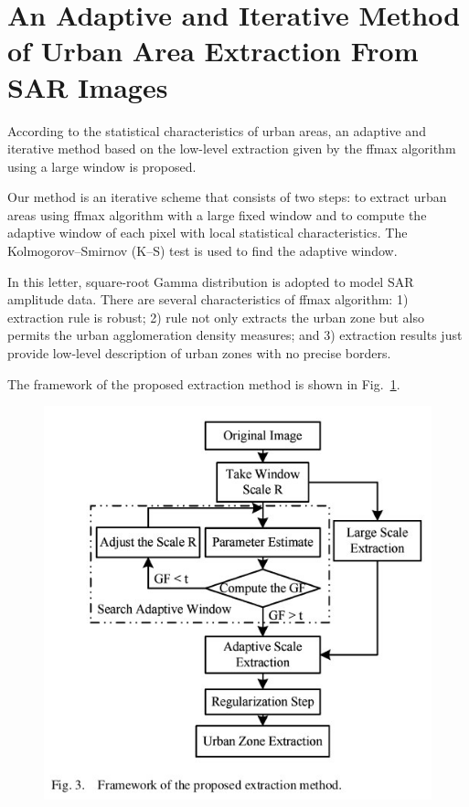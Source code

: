 \documentclass[paper=a4, fontsize=11pt]{scrartcl}
\begin{document}
\newpage

\section*{An Adaptive and Iterative Method of Urban Area Extraction From SAR Images}

According to the statistical characteristics of urban areas, an adaptive and iterative method based on the low-level extraction given by the ffmax algorithm using a large window is proposed. 

Our method is an iterative scheme that consists of two steps: to extract urban areas using ffmax algorithm with a large fixed window and to compute the adaptive window of each pixel with local statistical characteristics. 
The Kolmogorov–Smirnov (K–S) test is used to find the adaptive window.

In this letter, square-root Gamma distribution is adopted to model SAR amplitude data.
There are several characteristics of ffmax algorithm: 1) extraction rule is robust; 2) rule not only extracts the urban zone but also permits the urban agglomeration density measures; and 3) extraction results just provide low-level description of urban zones with no precise borders.

The framework of the proposed extraction method is shown in Fig.~\ref{Fig:Framework}.

\begin{figure}[hbt]
	\centering
	\includegraphics[width=0.5\linewidth]{Figures/Framework.jpg}
	\label{Fig:Framework}
\end{figure}
\end{document}
